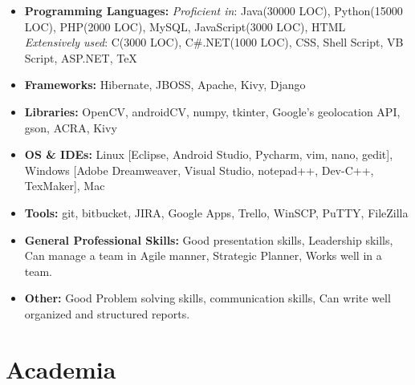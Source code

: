 \documentclass[11pt,letterpaper,sans]{moderncv}        %
\begin{document}
\begin{itemize}

\item \textbf{Programming Languages:} \emph{Proficient in}: Java(30000 LOC), Python(15000 LOC), PHP(2000 LOC), MySQL, JavaScript(3000 LOC), HTML \\ \emph{Extensively used}: C(3000 LOC), C\#.NET(1000 LOC), CSS, Shell Script, VB Script, ASP.NET, TeX

\vspace{1pt}

\item \textbf{Frameworks:} Hibernate, JBOSS, Apache, Kivy, Django

\vspace{1pt}

\item \textbf{Libraries:} OpenCV, androidCV, numpy, tkinter, Google's geolocation API, gson, ACRA, Kivy

\vspace{1pt}

\item \textbf{OS \& IDEs:} Linux [Eclipse, Android Studio, Pycharm, vim, nano, gedit], Windows [Adobe Dreamweaver, Visual Studio, notepad++, Dev-C++, TexMaker], Mac

\vspace{1pt}

\item \textbf{Tools:} git, bitbucket, JIRA, Google Apps, Trello, WinSCP, PuTTY, FileZilla

\vspace{1pt}

\item \textbf{General Professional Skills:} Good presentation skills, Leadership skills, Can manage a team in Agile manner, Strategic Planner, Works well in a team.

\vspace{1pt}

\item \textbf{Other:} Good Problem solving skills, communication skills, Can write well organized and structured reports.

\end{itemize}


\section{Academia}

\vspace{5pt}
\end{document}
